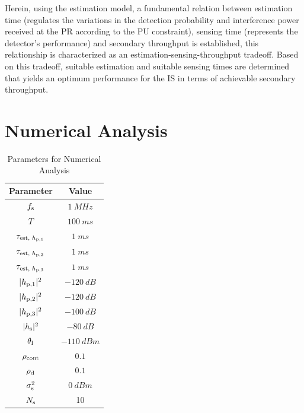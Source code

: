 \begin{remark} \label{co:coro1} 
\normalfont
Herein, using the estimation model, a fundamental relation between estimation time (regulates the variations in the detection probability and interference power received at the PR according to the PU constraint), sensing time (represents the detector's performance) and secondary throughput is established, this relationship is characterized as an estimation-sensing-throughput tradeoff. Based on this tradeoff, suitable estimation and suitable sensing times are determined that yields an optimum performance for the IS in terms of achievable secondary throughput. 
\end{remark} 
\section{Numerical Analysis} \label{sec:num_ana}

\begin{table}
\renewcommand{\arraystretch}{1.4}
\caption{Parameters for Numerical Analysis}
\label{tb:tb2}
\centering
\begin{tabular}{c||c}
\hline
\bfseries Parameter & \bfseries Value \\
\hline\hline
$f_{\text{s}}$ & $\SI{1}{MHz}$ \\ 
$T$ & $\SI{100}{ms}$ \\ 
$\tau_{\text{est, $h_{\text{p,1}}$}}$ & $\SI{1}{ms}$ \\
$\tau_{\text{est, $h_{\text{p,2}}$}}$ & $\SI{1}{ms}$ \\
$\tau_{\text{est, $h_{\text{p,3}}$}}$ & $\SI{1}{ms}$ \\
$|h_{\text{p,1}}|^2$ & $\SI{-120}{dB}$ \\ 
$|h_{\text{p,2}}|^2$ & $\SI{-120}{dB}$ \\ 
$|h_{\text{p,3}}|^2$ & $\SI{-100}{dB}$ \\ 
$|h_{\text{s}}|^2$ & $\SI{-80}{dB}$ \\ 
$\theta_{\text{I}}$ & $\SI{-110}{dBm}$ \\ 
$\rho_{\text{cont}}$ & $0.1$ \\
$\rho_{\text{d}}$ & $0.1$ \\
$\sigma^2_{\text{s}}$ & $\SI{0}{dBm}$ \\
$N_{\text{s}}$ & 10 \\ \hline
\end{tabular}
\end{table}

